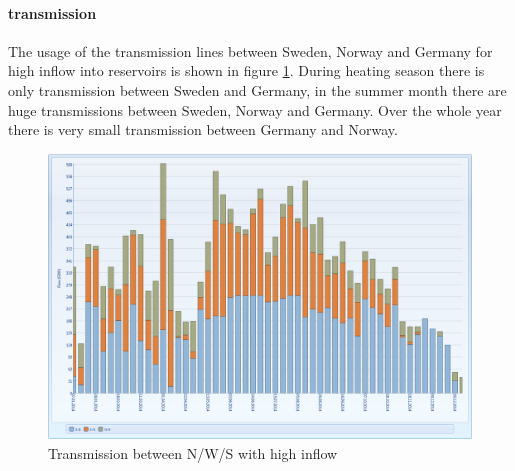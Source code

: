 \documentclass{article}
\begin{document}
\paragraph{transmission\\}
The usage of the transmission lines between Sweden, Norway and Germany for high inflow into reservoirs is shown in figure \ref{fig:MTnodetransmissionwet}. During heating season there is only transmission between Sweden and Germany, in the summer month there are huge transmissions between Sweden, Norway and Germany. Over the whole year there is very small transmission between Germany and Norway.
\begin{figure}[htbp]
\begin{center}
\includegraphics[width=13cm,keepaspectratio=true]{figures/wetcase/MTnodetransmissionwet}
\caption{Transmission between N/W/S with high inflow}
\label{fig:MTnodetransmissionwet}
\end{center}
\end{figure}
\end{document}
